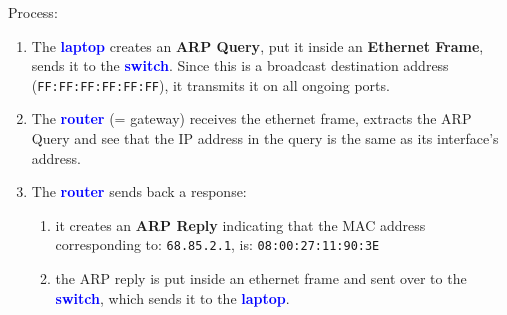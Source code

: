 \documentclass[a4paper]{article}
\begin{document}
Process:
\begin{enumerate}
    \item The \textcolor{blue}{\textbf{laptop}} creates an \textbf{ARP Query}, put it inside an \textbf{Ethernet Frame}, sends it to the \textcolor{blue}{\textbf{switch}}. Since this is a broadcast destination address (\texttt{FF:FF:FF:FF:FF:FF}), it transmits it on all ongoing ports.
    \item The \textcolor{blue}{\textbf{router}} (= gateway) receives the ethernet frame, extracts the ARP Query and see that the IP address in the query is the same as its interface's address.
    \item The \textcolor{blue}{\textbf{router}} sends back a response:
    \begin{enumerate}
        \item it creates an \textbf{ARP Reply} indicating that the MAC address corresponding to: \texttt{68.85.2.1}, is: \texttt{08:00:27:11:90:3E}
        \item the ARP reply is put inside an ethernet frame and sent over to the \textcolor{blue}{\textbf{switch}}, which sends it to the \textcolor{blue}{\textbf{laptop}}.
    \end{enumerate}
\end{enumerate}
\end{document}
